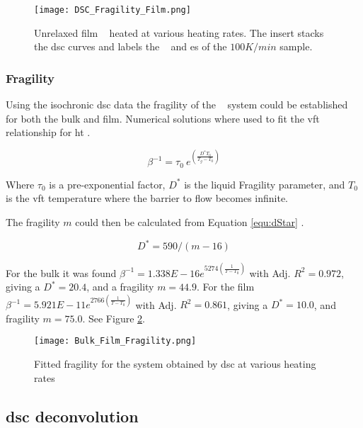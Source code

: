 \documentclass[draft,a4paper,12pt,oneside]{article}%
\begin{document}
\begin{figure}[b]
	\centering
	\texttt{[image: DSC\_Fragility\_Film.png]}
	\caption[Table of contents Capition]{Unrelaxed film \MgZnCa~ heated at various heating rates. The insert stacks the \gls{dsc} curves and labels the \Tg~ and \Tx es of the $100 K/min$ sample.}%
	\label{fig:DSC_vHeatingRate_Film}
\end{figure}

\subsubsection{Fragility}

Using the isochronic \acrshort{dsc} data the fragility of the \MgZnCa~ system could be established for both the bulk and film. Numerical solutions where used to fit the \gls{vft} relationship for \gls{ht} \cite{Busch1998}.

\begin{equation}
	\beta^{-1} = \tau_{0}~ e^{(\frac{D^{*}T_{0}}{T_{g}-T_{0}})}
	\label{equ:VFT}
\end{equation}

Where $\tau_{0}$ is a pre-exponential factor, $D^{*}$ is the liquid Fragility parameter, and $T_{0}$ is the \gls{vft} temperature where the barrier to flow becomes infinite.

The fragility $m$ could then be calculated from Equation \ref{equ:dStar} \cite{Angell2002, Wei2014}.

\begin{equation}
	D^{*}=590/(m-16)
	\label{equ:dStar}
\end{equation}

For the bulk it was found $\beta^{-1} = 1.338E - 16e^{5274 (\frac{1}{T-T_{0}})}$ with Adj. $R^{2}=0.972$, giving a $D^{*}=20.4$, and a fragility $m=44.9$. For the film $\beta^{-1} = 5.921E - 11e^{2766 (\frac{1}{T-T_{0}})}$ with Adj. $R^{2}=0.861$, giving a $D^{*}=10.0$, and fragility $m=75.0$. See Figure \ref{fig:Fragility_BulkFilm_mValue}.

\begin{figure}[b]
	\centering
	\texttt{[image: Bulk\_Film\_Fragility.png]}
	\caption[Table of contents Capition]{Fitted fragility for the \MgZnCa system obtained by \acrshort{dsc} at various heating rates}
	\label{fig:Fragility_BulkFilm_mValue}
\end{figure}

\subsection{\acrshort{dsc} deconvolution}
\end{document}
